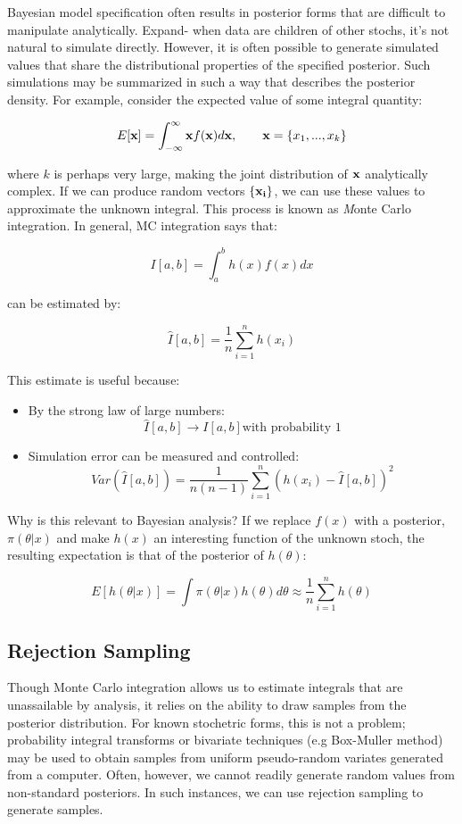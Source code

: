 \documentclass[]{book}
\begin{document}
Bayesian model specification often results in posterior forms that are difficult to manipulate analytically. Expand- when data are children of other stochs, it's not natural to simulate directly. However, it is often possible to generate simulated values that share the distributional properties of the specified posterior. Such simulations may be summarized in such a way that describes the posterior density. For example, consider the expected value of some integral quantity:

\[
E[{\bf x}] = \int_{-\infty}^{\infty} {\bf x} f({\bf x}) d{\bf x}, \qquad
{\bf x} = \{x_1,...,x_k\}
\]

\noindent where $k$ is perhaps very large, making the joint distribution of ${\bf x}$ analytically complex. If we can produce random vectors $\{{\bf x_i}\}$, we can use these values to approximate the unknown integral. This process is known as {\emph Monte Carlo integration}. In general, MC integration says that:

\[
I[a,b] = \int_a^b h(x) f(x) dx
\]

\noindent can be estimated by:

\[
\hat{I}[a,b] = \frac{1}{n}\sum_{i=1}^n h(x_i)
\]

\noindent This estimate is useful because:

\begin{itemize}
\item
By the strong law of large numbers:
\[\hat{I}[a,b] \rightarrow I[a,b] \mbox{with probability 1}\]
\item
Simulation error can be measured and controlled:
\[Var(\hat{I}[a,b]) = \frac{1}{n(n-1)}\sum_{i=1}^n (h(x_i)-\hat{I}[a,b])^2\]
\end{itemize}

Why is this relevant to Bayesian analysis? If we replace $f(x)$ with a posterior, $\pi(\theta|x)$ and make $h(x)$ an interesting function of the unknown stoch, the resulting expectation is that of the posterior of $h(\theta)$:

\[
E[h(\theta|x)] = \int \pi(\theta|x) h(\theta) d\theta \approx \frac{1}{n}\sum_{i=1}^n h(\theta)
\]

\subsection{Rejection Sampling}

Though Monte Carlo integration allows us to estimate integrals that are unassailable by analysis, it relies on the ability to draw samples from the posterior distribution. For known stochetric forms, this is not a problem; probability integral transforms or bivariate techniques (e.g Box-Muller method) may be used to obtain samples from uniform pseudo-random variates generated from a computer. Often, however, we cannot readily generate random values from non-standard posteriors. In such instances, we can use rejection sampling to generate samples.
\end{document}
